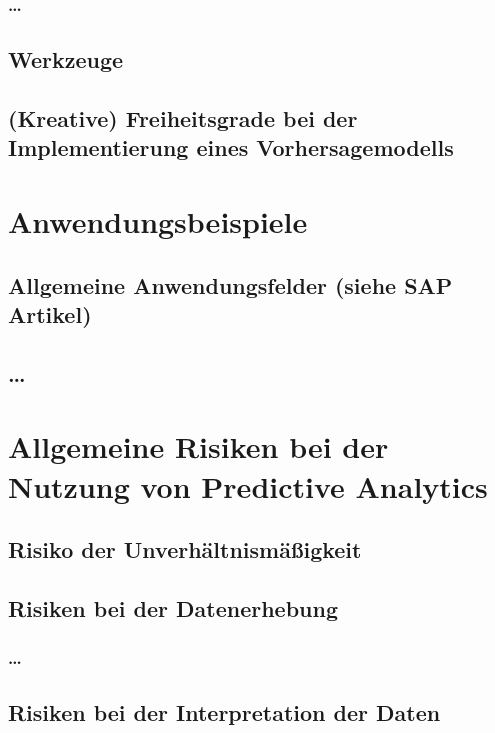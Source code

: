 \documentclass[12pt,a4paper,listof=totoc,oneside]{scrreprt}
\begin{document}
\subsubsection{\ldots}

\subsection{Werkzeuge}

\subsection{(Kreative) Freiheitsgrade bei der Implementierung eines
  Vorhersagemodells}

\section{Anwendungsbeispiele}

\subsection{Allgemeine Anwendungsfelder (siehe SAP Artikel)}

\subsection{\ldots}

\section{Allgemeine Risiken bei der Nutzung von Predictive Analytics}

\subsection{Risiko der Unverhältnismäßigkeit}

\subsection{Risiken bei der Datenerhebung}

\subsubsection{\ldots}

\subsection{Risiken bei der Interpretation der Daten}
\end{document}
